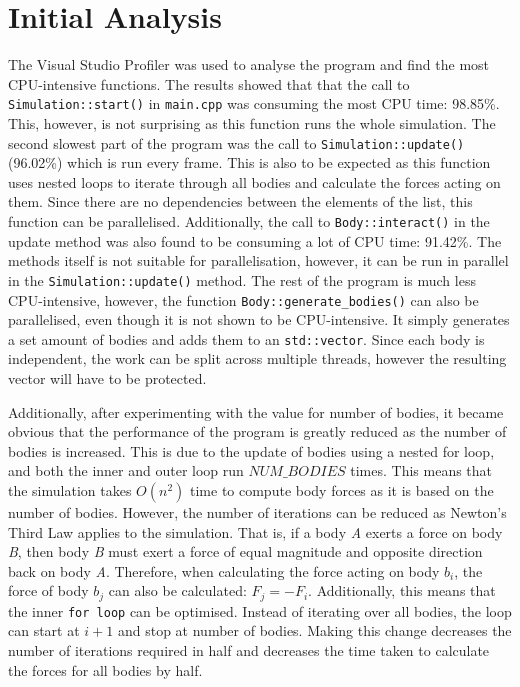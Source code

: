 \documentclass[12pt, a4paper]{article}
\begin{document}
    \section{Initial Analysis}     
    The Visual Studio Profiler was used to analyse the program and find the most CPU-intensive functions. The results showed that that the call to \texttt{Simulation::start()} in \texttt{main.cpp} was consuming the most CPU time: 98.85\%. This, however, is not surprising as this function runs the whole simulation. The second slowest part of the program was the call to \texttt{Simulation::update()} (96.02\%) which is run every frame. This is also to be expected as this function uses nested loops to iterate through all bodies and calculate the forces acting on them. Since there are no dependencies between the elements of the list, this function can be parallelised. Additionally, the call to \texttt{Body::interact()} in the update method was also found to be consuming a lot of CPU time: 91.42\%. The methods itself is not suitable for parallelisation, however, it can be run in parallel in the \texttt{Simulation::update()} method. The rest of the program is much less CPU-intensive, however, the function \texttt{Body::generate\_bodies()} can also be parallelised, even though it is not shown to be CPU-intensive. It simply generates a set amount of bodies and adds them to an \texttt{std::vector}. Since each body is independent, the work can be split across multiple threads, however the resulting vector will have to be protected.

    Additionally, after experimenting with the value for number of bodies, it became obvious that the performance of the program is greatly reduced as the number of bodies is increased. This is due to the update of bodies using a nested for loop, and both the inner and outer loop run $NUM\_BODIES$ times. This means that the simulation takes $O(n^2)$ time to compute body forces as it is based on the number of bodies. However, the number of iterations can be reduced as Newton's Third Law applies to the simulation. That is, if a body \textit{A} exerts a force on body \textit{B}, then body \textit{B} must exert a force of equal magnitude and opposite direction back on body \textit{A}. Therefore, when calculating the force acting on body $b_i$, the force of body $b_j$ can also be calculated: $F_j = -F_i$. Additionally, this means that the inner \texttt{for loop} can be optimised. Instead of iterating over all bodies, the loop can start at $i+1$ and stop at number of bodies. Making this change decreases the number of iterations required in half and decreases the time taken to calculate the forces for all bodies by half.
\end{document}
